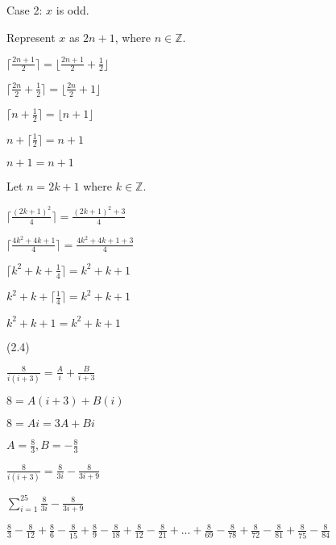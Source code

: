\documentclass{exam}
\begin{document}
\begin{questions}
\begin{subparts}
\begin{center}
Case 2: \(x\) is odd.

Represent \(x\) as \(2n + 1\), where \(n \in \mathbb{Z}\).

\( \lceil \frac{2n+1}{2} \rceil = \lfloor \frac{2n+1}{2} + \frac{1}{2} \rfloor \)

\( \lceil \frac{2n}{2} + \frac{1}{2} \rceil = \lfloor \frac{2n}{2} + 1 \rfloor \)

\( \lceil n + \frac{1}{2} \rceil = \lfloor n + 1 \rfloor \)

\( n + \lceil \frac{1}{2} \rceil = n + 1 \)

\( n + 1 = n + 1 \)

\end{center}


\begin{center}

Let \(n = 2k + 1\) where \(k \in \mathbb{Z}\).

\( \lceil \frac{(2k+1)^2}{4} \rceil = \frac{(2k+1)^2 + 3}{4} \)

\( \lceil \frac{4k^2 + 4k + 1}{4} \rceil = \frac{4k^2 + 4k + 1 + 3}{4} \)

\( \lceil k^2 + k + \frac{1}{4} \rceil = k^2 + k + 1 \)

\(  k^2 + k + \lceil \frac{1}{4} \rceil = k^2 + k + 1 \)

\(  k^2 + k + 1 = k^2 + k + 1 \)

\end{center}

\end{subparts}

 (2.4)
\begin{subparts}

\begin{center}

\( \frac{8}{i(i+3)} = \frac{A}{i} + \frac{B}{i+3} \)

\( 8 = A(i+3) + B(i) \)

\( 8 = Ai = 3A + Bi \)

\( A = \frac{8}{3}, B = -\frac{8}{3} \)

\( \frac{8}{i(i+3)} = \frac{8}{3i} - \frac{8}{3i+9} \)
\vspace{5px}

\( \sum_{i=1}^{25} \frac{8}{3i} - \frac{8}{3i+9} \)

\( \frac{8}{3} - \frac{8}{12} + \frac{8}{6} - \frac{8}{15} + \frac{8}{9} - \frac{8}{18} + \frac{8}{12} - \frac{8}{21} + ... + \frac{8}{69} - \frac{8}{78} + \frac{8}{72} - \frac{8}{81} + \frac{8}{75} - \frac{8}{84}\)


\end{center}
\end{subparts}
\end{questions}
\end{document}
